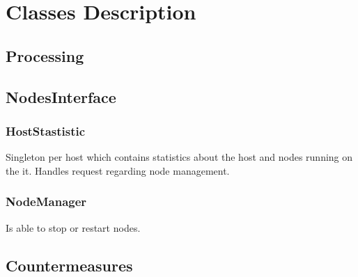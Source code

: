 \chapter{Classes Description}

\section{Processing}


\section{NodesInterface}

\subsection{HostStastistic}
Singleton per host which contains statistics about the host and nodes running on the it. Handles request regarding node management.

\subsection{NodeManager}
Is able to stop or restart nodes.


\section{Countermeasures}




\newpage
